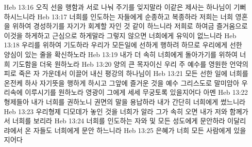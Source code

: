Heb 13:16  오직 선을 행함과 서로 나눠 주기를 잊지말라 이같은 제사는 하나님이 기뻐 하시느니라
Heb 13:17  너희를 인도하는 자들에게 순종하고 복종하라 저희는 너희 영혼을 위하여 경성하기를 자기가 회계할 자인 것 같이 하느니라 저희로 하여금 즐거움으로 이것을 하게하고 근심으로 하게말라 그렇지 않으면 너희에게 유익이 없느니라
Heb 13:18  우리를 위하여 기도하라 우리가 모든일에 선하게 행하려 하므로 우리에게 선한 양심이 있는 줄을 확신하노라
Heb 13:19  내가 더 속히 너희에게 돌아가기를 위하여 너희 기도함을 더욱 원하노라
Heb 13:20  양의 큰 목자이신 우리 주 예수를 영원한 언약의 피로 죽은 자 가운데서 이끌어 내신 평강의 하나님이
Heb 13:21  모든 선한 일에 너희를 온전케 하사 자기뜻을 행하게 하시고 그앞에 즐거운 것을 예수 그리스도로 말미암아 우리속에 이루시기를 원하노라 영광이 그에게 세세 무궁토록 있을지어다 아멘
Heb 13:22  형제들아 내가 너희를 권하노니 권면의 말을 용납하라 내가 간단히 너희에게 썼느니라
Heb 13:23  우리형제 디모데가 놓인 것을 너희가 알라 그가 속히 오면 내가 저와 함께가서 너희를 보리라
Heb 13:24  너희를 인도하는 자와 및 모든 성도에게 문안하라 이달리랴에서 온 자들도 너희에게 문안 하느니라
Heb 13:25  은혜가 너희 모든 사람에게 있을지어다



